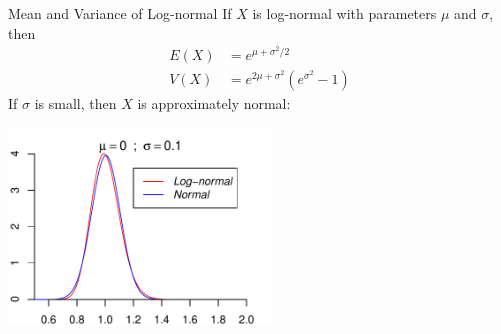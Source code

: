 \documentclass{beamer}
\begin{document}
\begin{frame}{Mean and Variance of Log-normal}
If $X$ is log-normal with parameters $\mu$ and $\sigma$, then
\begin{align*}
E(X) &= e^{\mu+\sigma^2/2}\\
V(X) &= e^{2\mu+\sigma^2}(e^{\sigma^2}-1)
\end{align*}
If $\sigma$ is small, then $X$ is approximately normal:
\begin{center}
\includegraphics[width=7cm]{ch4_pdf_logn2.pdf}
\end{center}
\end{frame}



\end{document}
